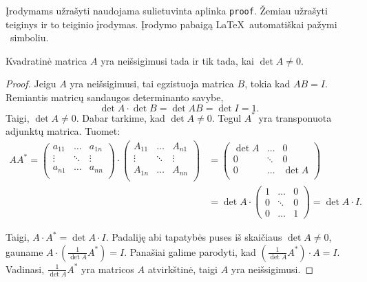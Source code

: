 \documentclass[]{VUMIFTemplateClass}
\begin{document}
\noindent Įrodymams užrašyti naudojama sulietuvinta aplinka \texttt{proof}. Žemiau užrašyti teiginys ir to teiginio įrodymas. Įrodymo pabaigą \LaTeX\ automatiškai pažymi \square\ simboliu.
\begin{proposition}
    Kvadratinė matrica $A$ yra neišsigimusi tada ir tik tada, kai $\det A \ne 0$.
\end{proposition}
\begin{proof}
    Jeigu $A$ yra neišsigimusi, tai egzistuoja matrica $B$, tokia kad $AB=I$. Remiantis matricų sandaugos determinanto savybe,
    \[
        \det A \cdot \det B = \det AB = \det I = 1.
    \]
    Taigi, $\det A \ne 0$.
    Dabar tarkime, kad $\det A \ne 0$. Tegul $A^*$ yra transponuota adjunktų matrica. Tuomet:
    \[\begin{split}
        A A^* =
        \begin{pmatrix}
            a_{11} & \dots & a_{1n} \\
            \vdots & \ddots & \vdots \\
            a_{n1} & \dots & a_{nn} \\
        \end{pmatrix} \cdot
        \begin{pmatrix}
            A_{11} & \dots & A_{n1} \\
            \vdots & \ddots & \vdots \\
            A_{1n} & \dots & A_{nn} \\
        \end{pmatrix} 
&=  \begin{pmatrix}
            \det A  & \dots & 0 \\
                  0 & \ddots & 0 \\
                  0 & \dots & \det A \\
        \end{pmatrix}
        \\
        &=\det A \cdot
        \begin{pmatrix}
            1 & \dots & 0\\
            0 & \ddots & 0\\
            0 & \dots & 1
        \end{pmatrix} = \det A \cdot I.
    \end{split}\]

    Taigi, $A \cdot A^* = \det A \cdot I$. Padaliję abi tapatybės puses iš skaičiaus $\det A \ne 0$, gauname $A \cdot \left(\frac{1}{\det A}A^*\right) = I$. Panašiai galime parodyti, kad $\left(\frac{1}{\det A}A^*\right) \cdot A = I$. Vadinasi, $\frac{1}{\det A}A^*$ yra matricos $A$ atvirkštinė, taigi $A$ yra neišsigimusi.
    \end{proof}
\end{document}
